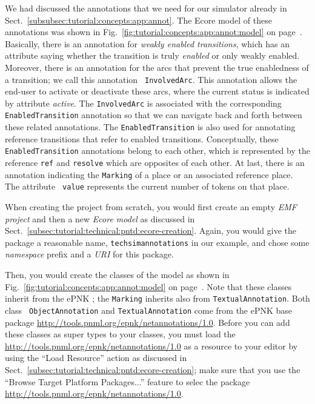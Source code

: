 We had discussed the annotations that we need for our simulator already in
Sect.~\ref{subsubsec:tutorial:concepts:app:annot}. The Ecore model of
these annotations was shown in Fig.~\ref{fig:tutorial:concepts:app:annot:model}
on page~\pageref{fig:tutorial:concepts:app:annot:model}.
Basically, there is an annotation for \emph{weakly enabled transitions}, which
has an attribute saying whether the transition is truly \emph{enabled} or only
weakly enabled. Moreover, there is an annotation for the arcs that prevent the
true enabledness of a transition; we call this annotation {\tt
InvolvedArc}. This annotation allows the end-user to activate or deactivate
these arcs, where the current status is indicated by attribute \emph{active}.
The {\tt InvolvedArc} is associated with the corresponding {\tt
EnabledTransition} annotation so that we can navigate back and forth between
these related annotations.
The {\tt EnabledTransition} is also used for annotating reference transitions
that refer to enabled transitions.
Conceptually, these {\tt EnabledTransition} annotations belong to each other,
which is represented by the reference {\tt ref} and {\tt resolve} which are
opposites of each other. At last, there is an annotation indicating the
{\tt Marking} of a place or an associated reference place. The attribute {\tt
value} represents the current number of tokens on that place.

When creating the project from scratch, you would first create an empty
\emph{EMF project} and then a new \emph{Ecore model} as discussed in
Sect.~\ref{subsec:tutorial:technical:pntd:ecore-creation}. Again, you would give
the package a reasonable name, {\tt techsimannotations} in our example, and
chose some \emph{namespace} prefix and a \emph{URI} for this package.

Then, you would create the classes of the model as shown in
Fig.~\ref{fig:tutorial:concepts:app:annot:model} on
page~\pageref{fig:tutorial:concepts:app:annot:model}. Note that these
classes inherit from the ePNK ;  the {\tt Marking}
inherits also from {\tt TextualAnnotation}. Both class {\tt
ObjectAnnotation} and {\tt TextualAnnotation} come from the ePNK base package
\url{ http://tools.pnml.org/epnk/netannotations/1.0}. Before you can add these
classes as super types to your classes, you must load the
\url{http://tools.pnml.org/epnk/netannotations/1.0} as a resource to your editor
by using the ``Load Resource'' action as discussed in
Sect.~\ref{subsec:tutorial:technical:pntd:ecore-creation}; make sure that you
use the ``Browse Target Platform Packages...'' feature to selec  the package 
\url{http://tools.pnml.org/epnk/netannotations/1.0}.

